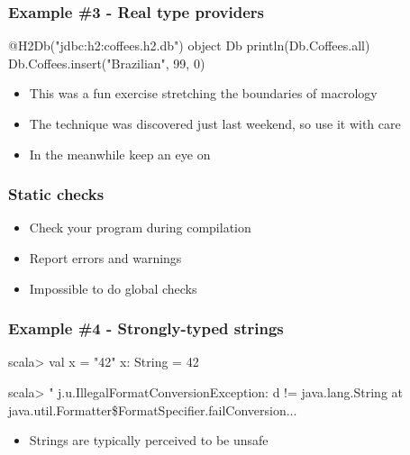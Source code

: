 \documentclass[svgnames,hyperref={bookmarks=false}]{beamer}
\begin{document}
\begin{frame}[fragile]
\frametitle{Example \#3 - Real type providers}

\begin{semiverbatim}
\alert{@H2Db(}"jdbc:h2:coffees.h2.db"\alert{)} object Db
println(Db.Coffees.all)
Db.Coffees.insert("Brazilian", 99, 0)

\end{semiverbatim}

\begin{itemize}
\item This was a fun exercise stretching the boundaries of macrology
\item The technique was discovered just last weekend, so use it with care
\item In the meanwhile keep an eye on 
\end{itemize}
\end{frame}

\begin{frame}[fragile]
\frametitle{}

\vskip40pt
\begin{center}
\end{center}
\end{frame}

\begin{frame}[fragile]
\frametitle{Static checks}

\begin{itemize}
\item Check your program during compilation
\item Report errors and warnings
\item Impossible to do global checks
\end{itemize}
\end{frame}

\begin{frame}[fragile]
\frametitle{Example \#4 - Strongly-typed strings}

\begin{semiverbatim}
scala> val x = "42"
x: String = 42

scala> "%
j.u.IllegalFormatConversionException: d != java.lang.String
  at java.util.Formatter\$FormatSpecifier.failConversion...
\end{semiverbatim}

\begin{itemize}
\item Strings are typically perceived to be unsafe
\end{itemize}
\end{frame}
\end{document}
